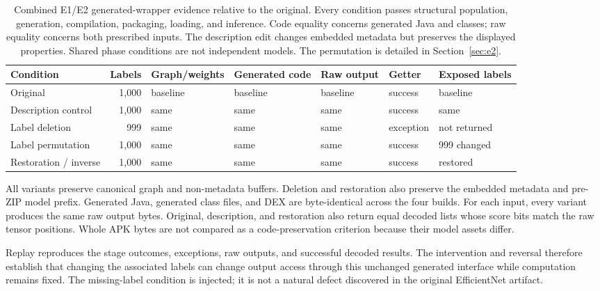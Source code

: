 \documentclass[10pt,twocolumn,letterpaper]{article}
\begin{document}
\begin{table}[t]
\centering\small
\setlength{\tabcolsep}{6pt}
\begin{tabular}{@{}lrlllll@{}}
\toprule
Condition & Labels & Graph/weights & Generated code & Raw output & Getter & Exposed labels\\
\midrule
Original & 1,000 & baseline & baseline & baseline & success & baseline\\
Description control & 1,000 & same & same & same & success & same\\
Label deletion & 999 & same & same & same & exception & not returned\\
Label permutation & 1,000 & same & same & same & success & 999 changed\\
Restoration / inverse & 1,000 & same & same & same & success & restored\\
\bottomrule
\end{tabular}
\caption{Combined E1/E2 generated-wrapper evidence relative to the original. Every condition passes structural population, generation, compilation, packaging, loading, and inference. Code equality concerns generated Java and classes; raw equality concerns both prescribed inputs. The description edit changes embedded metadata but preserves the displayed properties. Shared phase conditions are not independent models. The permutation is detailed in Section~\ref{sec:e2}.}
\label{tab:e1}
\end{table}

All variants preserve canonical graph and non-metadata buffers. Deletion and restoration also preserve the embedded metadata and pre-ZIP model prefix. Generated Java, generated class files, and DEX are byte-identical across the four builds. For each input, every variant produces the same raw output bytes. Original, description, and restoration also return equal decoded lists whose score bits match the raw tensor positions. Whole APK bytes are not compared as a code-preservation criterion because their model assets differ.

Replay reproduces the stage outcomes, exceptions, raw outputs, and successful decoded results. The intervention and reversal therefore establish that changing the associated labels can change output access through this unchanged generated interface while computation remains fixed. The missing-label condition is injected; it is not a natural defect discovered in the original EfficientNet artifact.
\end{document}
